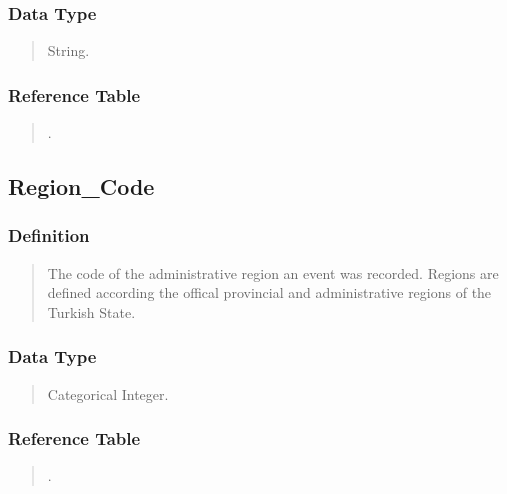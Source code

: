 \documentclass[letterpaper,10pt,english]{sphinxmanual}
\begin{document}
\subsubsection{Data Type}
\label{\detokenize{schema_tables:id23}}\begin{quote}

\sphinxAtStartPar
String.
\end{quote}


\subsubsection{Reference Table}
\label{\detokenize{schema_tables:id24}}\begin{quote}

\sphinxAtStartPar
{\hyperref[\detokenize{schema_tables:region-table}]{}}.
\end{quote}


\subsection{Region\_Code}
\label{\detokenize{schema_tables:region-code}}

\subsubsection{Definition}
\label{\detokenize{schema_tables:id25}}\begin{quote}

\sphinxAtStartPar
The code of the administrative region an event was recorded.  Regions are defined according the offical provincial and administrative regions of the Turkish State.
\end{quote}


\subsubsection{Data Type}
\label{\detokenize{schema_tables:id26}}\begin{quote}

\sphinxAtStartPar
Categorical Integer.
\end{quote}


\subsubsection{Reference Table}
\label{\detokenize{schema_tables:id27}}\begin{quote}

\sphinxAtStartPar
{\hyperref[\detokenize{schema_tables:region-table}]{}}.
\end{quote}
\end{document}
